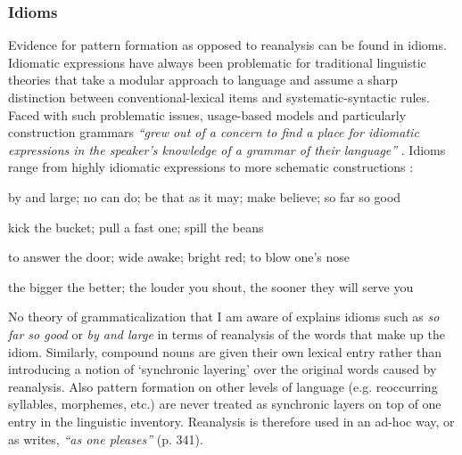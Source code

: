  

\subsubsection{Idioms}
 Evidence for pattern formation as opposed to reanalysis can be found in idioms. Idiomatic expressions have always been problematic for traditional linguistic theories that take a modular approach to language and assume a sharp distinction between conventional-lexical items and systematic-syntactic rules. Faced with such problematic issues, usage-based models and particularly construction grammars {\em ``grew out of a concern to find a place for idiomatic expressions in the speaker's knowledge of a grammar of their language''} \citep[225]{croft04cognitive}. Idioms range from highly idiomatic expressions to more schematic constructions \citep[][chapter 9]{croft04cognitive}:

\ea
by and large; no can do; be that as it may; make believe; so far so good
\item kick the bucket; pull a fast one; spill the beans
\item to answer the door; wide awake; bright red; to blow one's nose
\item the bigger the better; the louder you shout, the sooner they will serve you
\z

No theory of grammaticalization that I am aware of explains idioms such as {\em so far so good} or {\em by and large} in terms of reanalysis of the words that make up the idiom. Similarly, compound nouns are given their own lexical entry rather than introducing a notion of `synchronic layering' \citep[124--126]{hopper93grammaticalization} over the original words caused by reanalysis. Also pattern formation on other levels of language (e.g. reoccurring syllables, morphemes, etc.) are never treated as synchronic layers on top of one entry in the linguistic inventory. Reanalysis is therefore used in an ad-hoc way, or as \citet{haspelmath98does} writes, {\em ``as one pleases''} (p. 341).

